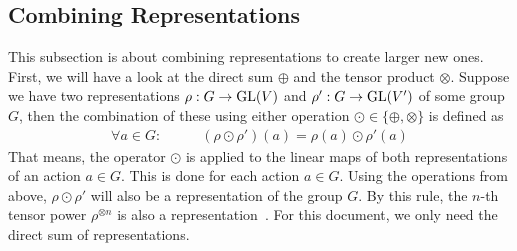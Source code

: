 \subsection{Combining Representations}

This subsection is about combining representations to create larger new ones.
First, we will have a look at the direct sum $\oplus$ and the tensor product $\otimes$.
Suppose we have two representations $\rho: G \to \operatorname{GL}(V)$ and $\rho': G \to \operatorname{GL}(V')$ of some group $G$, then the combination of these using either operation $\odot \in \{\oplus, \otimes\}$ is defined as
\begin{align*}
    \forall a \in G: \qquad & (\rho \odot \rho')(a) = \rho(a) \odot \rho'(a)
\end{align*}
That means, the operator $\odot$ is applied to the linear maps of both representations of an action $a \in G$.
This is done for each action $a \in G$.
Using the operations from above, $\rho \odot \rho'$ will also be a representation of the group $G$.
By this rule, the $n$-th tensor power $\rho^{\otimes n}$ is also a representation~\cite{fulton2013}.
For this document, we only need the direct sum of representations.

